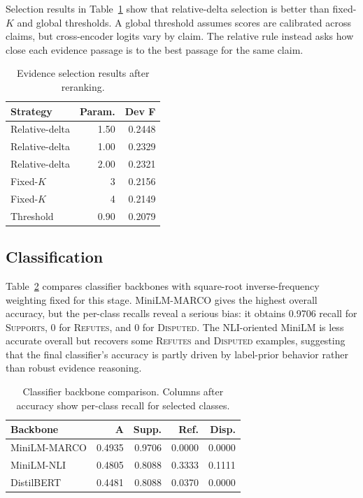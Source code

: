 \documentclass[11pt]{article}
\begin{document}
Selection results in Table~\ref{tab:selection} show that relative-delta selection is better than fixed-$K$ and global thresholds. A global threshold assumes scores are calibrated across claims, but cross-encoder logits vary by claim. The relative rule instead asks how close each evidence passage is to the best passage for the same claim.

\begin{table}[t]
  \centering
  \small
  \begin{tabular}{lrr}
    \toprule
    \textbf{Strategy} & \textbf{Param.} & \textbf{Dev F} \\
    \midrule
    Relative-delta & 1.50 & 0.2448 \\
    Relative-delta & 1.00 & 0.2329 \\
    Relative-delta & 2.00 & 0.2321 \\
    Fixed-$K$ & 3 & 0.2156 \\
    Fixed-$K$ & 4 & 0.2149 \\
    Threshold & 0.90 & 0.2079 \\
    \bottomrule
  \end{tabular}
  \caption{Evidence selection results after reranking.}
  \label{tab:selection}
\end{table}

\subsection{Classification}

Table~\ref{tab:classification} compares classifier backbones with square-root inverse-frequency weighting fixed for this stage. MiniLM-MARCO gives the highest overall accuracy, but the per-class recalls reveal a serious bias: it obtains 0.9706 recall for \textsc{Supports}, 0 for \textsc{Refutes}, and 0 for \textsc{Disputed}. The NLI-oriented MiniLM is less accurate overall but recovers some \textsc{Refutes} and \textsc{Disputed} examples, suggesting that the final classifier's accuracy is partly driven by label-prior behavior rather than robust evidence reasoning.

\begin{table}[t]
  \centering
  \small
  \setlength{\tabcolsep}{3pt}
  \begin{tabular}{lrrrr}
    \toprule
    \textbf{Backbone} & \textbf{A} & \textbf{Supp.} & \textbf{Ref.} & \textbf{Disp.} \\
    \midrule
    MiniLM-MARCO & 0.4935 & 0.9706 & 0.0000 & 0.0000 \\
    MiniLM-NLI & 0.4805 & 0.8088 & 0.3333 & 0.1111 \\
    DistilBERT & 0.4481 & 0.8088 & 0.0370 & 0.0000 \\
    \bottomrule
  \end{tabular}
  \caption{Classifier backbone comparison. Columns after accuracy show per-class recall for selected classes.}
  \label{tab:classification}
\end{table}
\end{document}
